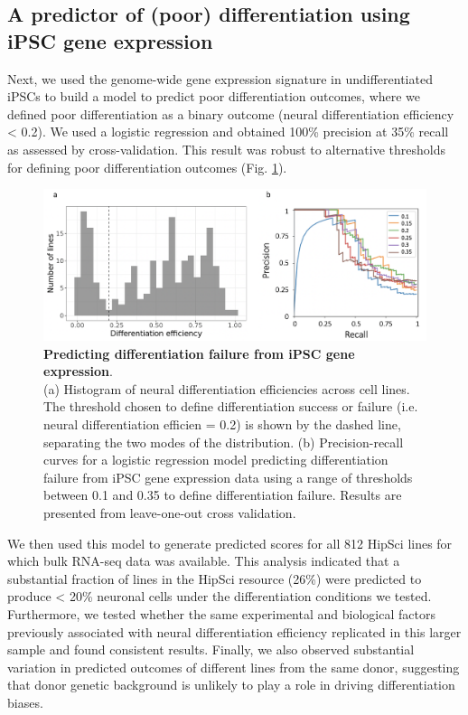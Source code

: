 \newpage

\subsection{A predictor of (poor) differentiation using iPSC gene expression}

Next, we used the genome-wide gene expression signature in undifferentiated iPSCs to build a model to predict poor differentiation outcomes, where we defined poor differentiation as a binary outcome (neural differentiation efficiency < 0.2).
We used a logistic regression and obtained 100\% precision at 35\% recall as assessed by cross-validation. 
This result was robust to alternative thresholds for defining poor differentiation outcomes (Fig. \ref{fig:neuroseq_diff_eff_predictor}). 

\begin{figure}[h]
\centering
\includegraphics[width=15.5cm]{Chapter5/Fig/neuroseq_diff_eff_predict.png}
\caption[Predicting differentiation failure from iPSC gene expression]{\textbf{Predicting differentiation failure from iPSC gene expression}.\\
(a) Histogram of neural differentiation efficiencies across cell lines. 
The threshold chosen to define differentiation success or failure (i.e. neural differentiation efficien = 0.2) is shown by the dashed line, separating the two modes of the distribution. 
(b) Precision-recall curves for a logistic regression model predicting differentiation failure from iPSC gene expression data \cite{cuomo2020single} using a range of thresholds between 0.1 and 0.35 to define differentiation failure. 
Results are presented from leave-one-out cross validation.}
\label{fig:neuroseq_diff_eff_predictor}
\end{figure}

We then used this model to generate predicted scores for all 812 HipSci lines for which bulk RNA-seq data was available.
This analysis indicated that a substantial fraction of lines in the HipSci resource (26\%) were predicted to produce < 20\% neuronal cells under the differentiation conditions we tested.
Furthermore, we tested whether the same experimental and biological factors previously associated with neural differentiation efficiency replicated in this larger sample and found consistent results.
Finally, we also observed substantial variation in predicted outcomes of different lines from the same donor, suggesting that donor genetic background is unlikely to play a role in driving differentiation biases.

